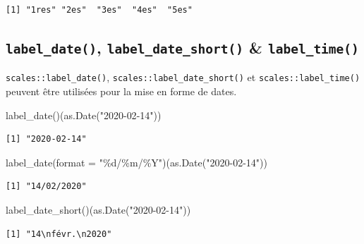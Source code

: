\documentclass[
  letterpaper,
  DIV=11,
  numbers=noendperiod,
  oneside]{scrreprt}
\newenvironment{Shaded}{\begin{snugshade}}{\end{snugshade}}
\newcommand{\AttributeTok}[1]{\textcolor[rgb]{0.40,0.45,0.13}{#1}}
\newcommand{\FunctionTok}[1]{\textcolor[rgb]{0.28,0.35,0.67}{#1}}
\newcommand{\NormalTok}[1]{\textcolor[rgb]{0.00,0.23,0.31}{#1}}
\newcommand{\StringTok}[1]{\textcolor[rgb]{0.13,0.47,0.30}{#1}}
\begin{document}
\begin{verbatim}
[1] "1res" "2es"  "3es"  "4es"  "5es" 
\end{verbatim}

\hypertarget{label_date-label_date_short-label_time}{%
\subsection{\texorpdfstring{\texttt{label\_date()},
\texttt{label\_date\_short()} \&
\texttt{label\_time()}}{label\_date(), label\_date\_short() \& label\_time()}}\label{label_date-label_date_short-label_time}}

\texttt{scales::label\_date()}, \texttt{scales::label\_date\_short()} et
\texttt{scales::label\_time()} peuvent être utilisées pour la mise en
forme de dates.

\begin{Shaded}
\begin{Highlighting}[]
\FunctionTok{label\_date}\NormalTok{()(}\FunctionTok{as.Date}\NormalTok{(}\StringTok{"2020{-}02{-}14"}\NormalTok{))}
\end{Highlighting}
\end{Shaded}

\begin{verbatim}
[1] "2020-02-14"
\end{verbatim}

\begin{Shaded}
\begin{Highlighting}[]
\FunctionTok{label\_date}\NormalTok{(}\AttributeTok{format =} \StringTok{"\%d/\%m/\%Y"}\NormalTok{)(}\FunctionTok{as.Date}\NormalTok{(}\StringTok{"2020{-}02{-}14"}\NormalTok{))}
\end{Highlighting}
\end{Shaded}

\begin{verbatim}
[1] "14/02/2020"
\end{verbatim}

\begin{Shaded}
\begin{Highlighting}[]
\FunctionTok{label\_date\_short}\NormalTok{()(}\FunctionTok{as.Date}\NormalTok{(}\StringTok{"2020{-}02{-}14"}\NormalTok{))}
\end{Highlighting}
\end{Shaded}

\begin{verbatim}
[1] "14\nfévr.\n2020"
\end{verbatim}
\end{document}
